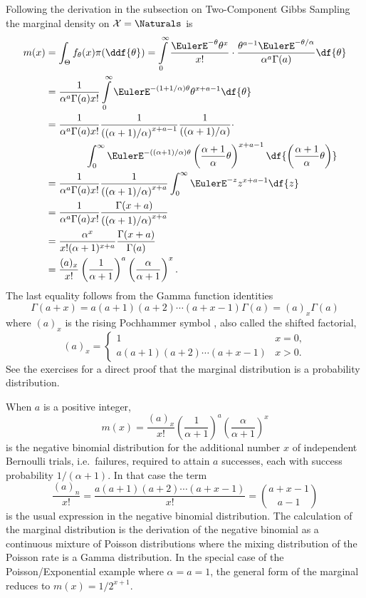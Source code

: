 \documentclass[12pt]{article}
\begin{document}
Following the derivation in the subsection on Two-Component Gibbs
Sampling the marginal density on \( \mathcal{X} = \Naturals \) is
\begin{align*}
    m(x) &= \int_{\Theta} f_{\theta}(x) \pi(\ddf{\theta}) = \int\limits_0^
    {\infty} \frac{\EulerE^{-\theta} \theta^x}{x!} \cdot \frac{ \theta^{a-1}
    \EulerE^{-\theta/\alpha}}{\alpha^a \Gamma(a)} \df{\theta} \\
    &= \frac{1}{\alpha^a \Gamma(a) x!} \int\limits_0^{\infty} \EulerE^{-
    (1+1/\alpha)\theta} \theta^{x + a - 1} \df{\theta} \\
    &= \frac{1}{\alpha^a \Gamma(a) x!} \frac{1}{\left( (\alpha + 1)/\alpha
    \right)^{x+a-1}} \frac{1}{\left( (\alpha + 1)/\alpha \right)} \cdot
    \\
    &\qquad \qquad \int_0^ {\infty} \EulerE^{-((\alpha+1)/\alpha)\theta}
    \left( \frac{\alpha+1} {\alpha} \theta \right)^{x+a-1} \df{ \left(
    \frac{\alpha+1}{\alpha} \theta \right)} \\
    &= \frac{1}{\alpha^a \Gamma(a) x!} \frac{1}{\left( (\alpha + 1)/\alpha
    \right)^{x+a}} \int_0^{\infty} \EulerE^{-z} z^{x+a-1} \df{z} \\
    &= \frac{1}{\alpha^a \Gamma(a) x!} \frac{\Gamma(x+a)}{\left( (\alpha
    + 1)/\alpha \right)^{x+a}} \\
    &= \frac{\alpha^x}{x!  (\alpha + 1)^{x+a}} \frac{\Gamma(x+a)}{\Gamma
    (a)} \\
    &= \frac{(a)_x}{x!}\left( \frac{1}{\alpha+1} \right)^a \left( \frac{\alpha}
    {\alpha+1} \right)^x.
\end{align*}
The last equality follows from the Gamma function identities
\[
    \Gamma(a+x) = a(a+1)(a+2)\cdots(a+x-1) \Gamma(a) = (a)_x \Gamma(a)
\] where \( (a)_x \) is the rising Pochhammer symbol%
%
, also called the shifted factorial,
\[
    (a)_x =
    \begin{cases}
        1 & x = 0, \\
        a(a+1)(a+2)\cdots(a+x-1) & x > 0.
    \end{cases}
\] See the exercises for a direct proof that the marginal distribution
is a probability distribution.

When \( a \) is a positive integer,
\[
    m(x) = \frac{(a)_x}{x!}\left( \frac{1}{\alpha+1} \right)^a \left(
    \frac{\alpha}{\alpha+1}\right)^x
\] is the negative binomial distribution for the additional number \( x \)
of independent Bernoulli trials, i.e.\ failures, required to attain \( a
\) successes, each with success probability \( 1/(\alpha+1) \).%
In that case the term
\[
    \frac{(a)_n}{x!} = \frac{a(a+1)(a+2)\cdots(a+x-1)}{x!} = \binom{a+x-1}
    {a-1}
\] is the usual expression in the negative binomial distribution. The
calculation of the marginal distribution is the derivation of the
negative binomial as a continuous mixture of Poisson distributions where
the mixing distribution of the Poisson rate is a Gamma distribution.  In
the special case of the Poisson/Exponential example where \( \alpha = a
= 1 \), the general form of the marginal reduces to \( m(x) = 1/2^{x+1} \).
\end{document}
